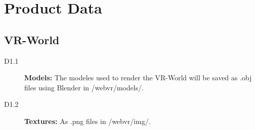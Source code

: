 \section{Product Data}

\subsection{VR-World}

\begin{description}
  \item[D1.1] \textbf{Models:} The modeles used to render the VR-World will be saved as .obj files using Blender in /webvr/models/.
  \item[D1.2] \textbf{Textures:} As .png files in /webvr/img/.
\end{description}

